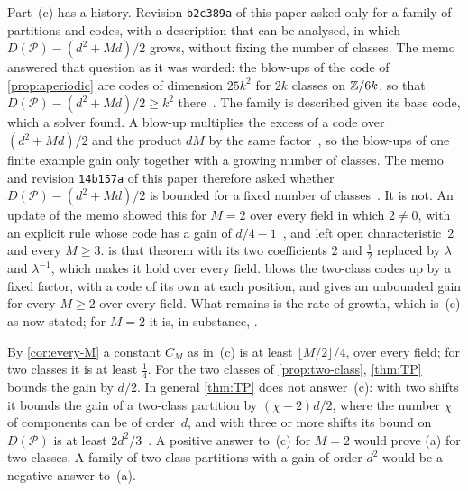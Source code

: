 Part~(c) has a history. Revision \texttt{b2c389a} of this paper asked only for a family of partitions and codes, with
a description that can be analysed, in which $D(\mathcal P)-(d^2+Md)/2$ grows, without fixing the number of classes.
The memo~\cite{ClassUniformMemo2026} answered that question as it was worded: the blow-ups of the code of
\cref{prop:aperiodic} are codes of dimension $25k^2$ for $2k$ classes on $\mathbb{Z}/6k$, so that
$D(\mathcal P)-(d^2+Md)/2\ge k^2$ there~\cite[Theorem~4.2 and Corollary~4.4]{ClassUniformMemo2026}. The family is
described given its base code, which a solver found. A blow-up multiplies the excess of a code over $(d^2+Md)/2$ and
the product $dM$ by the same factor~\cite[Corollary~4.3]{ClassUniformMemo2026}, so the blow-ups of one finite example
gain only together with a growing number of classes. The memo and revision \texttt{14b157a} of this paper therefore
asked whether $D(\mathcal P)-(d^2+Md)/2$ is bounded for a fixed number of
classes~\cite[Problem~6.2]{ClassUniformMemo2026}. It is not. An update of the memo showed this for $M=2$ over every
field in which $2\ne0$, with an explicit rule whose code has a gain of
$d/4-1$~\cite[Theorem~4.8 and Corollary~4.10]{ClassUniformMemo2026}, and left open characteristic~$2$ and every
$M\ge3$.  is that theorem with its two coefficients $2$ and $\tfrac12$ replaced by $\lambda$ and
$\lambda^{-1}$, which makes it hold over every field.  blows the two-class codes up by a fixed
factor, with a code of its own at each position, and gives an unbounded gain for every $M\ge2$ over every field. What
remains is the rate of growth, which is~(c) as now stated; for $M=2$ it is, in substance,
\cite[Problem~6.3]{ClassUniformMemo2026}.

By \cref{cor:every-M} a constant $C_M$ as in~(c) is at least $\lfloor M/2\rfloor/4$, over every field; for two classes
it is at least $\tfrac14$. For the two classes of \cref{prop:two-class}, \cref{thm:TP} bounds the gain by $d/2$. In
general \cref{thm:TP} does not answer~(c): with two shifts it bounds the gain of a two-class partition by
$(\chi-2)d/2$, where the number $\chi$ of components can be of order~$d$, and with three or more shifts its bound on
$D(\mathcal P)$ is at least $2d^2/3$~\cite[Section~6]{ClassUniformMemo2026}. A positive answer to~(c) for $M=2$ would
prove (a) for two classes. A family of two-class partitions with a gain of order $d^2$ would be a negative answer
to~(a).


